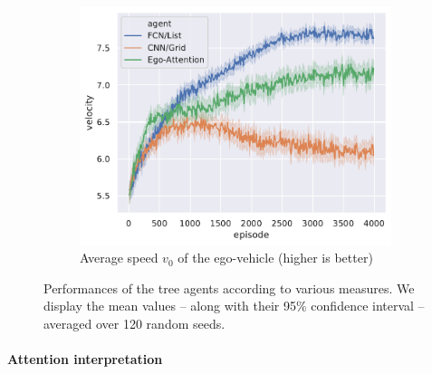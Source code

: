 \begin{figure}[htp]
	\begin{subfigure}[t]{0.49\linewidth}
		\includegraphics[width=\linewidth]{img/velocity}
		\caption{Average speed $v_0$ of the ego-vehicle (higher is better)}
		\label{fig:attention-velocity}
	\end{subfigure}
	\caption{Performances of the tree agents according to various measures. We display the mean values -- along with their 95\% confidence interval -- averaged over 120 random seeds.}
	\label{fig:attention-results}
\end{figure}

\paragraph{Attention interpretation}

